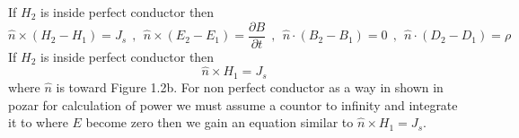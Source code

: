 If $H_2$ is inside perfect conductor then 
\setlength{\abovedisplayshortskip}{7pt}
\setlength{\belowdisplayshortskip}{7pt}
\setlength{\abovedisplayskip}{7pt}
\setlength{\belowdisplayskip}{7pt}
$$\hat{n} \times ( H_2 - H_1 ) = J_s ~~ , ~~ \hat{n} \times ( E_2 - E_1 ) = \frac{\partial B}{\partial t} ~~ , ~~ \hat{n} \cdot ( B_2 - B_1 ) = 0 ~~ , ~~ \hat{n} \cdot ( D_2 - D_1 ) = \rho $$
If $H_2$ is inside perfect conductor then 
$$ \hat{n} \times H_1 = J_s $$
where $\hat{n}$ is toward \cite{inan} Figure 1.2b. For non perfect conductor as a way in shown in pozar for calculation of power we must assume a countor to infinity and integrate it to where $E$ become zero then we gain an equation similar to $ \hat{n} \times H_1 = J_s $.
